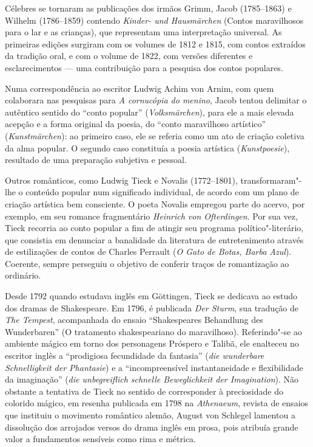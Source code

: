 Célebres se tornaram as publicações dos irmãos Grimm, Jacob (1785--1863)
e Wilhelm (1786--1859) contendo \textit{Kinder- und Hausmärchen}
(Contos maravilhosos para o lar e as crianças), que
representam uma interpretação universal. As primeiras edições surgiram
com os volumes de 1812 e 1815, com contos extraídos da tradição oral, e
com o volume de 1822, com versões diferentes e esclarecimentos — uma
contribuição para a pesquisa dos contos populares.

Numa correspondência ao escritor Ludwig Achim von Arnim, com quem
colaborara nas pesquisas para \textit{A cornucópia do menino}, Jacob tentou
delimitar o autêntico sentido do ``conto popular'' (\textit{Volksmärchen}), para
ele a mais elevada acepção e a forma original da poesia, do ``conto maravilhoso
artístico'' (\textit{Kunstmärchen}): ao primeiro caso, ele se referia como um ato
de criação coletiva da alma popular. O segundo caso constituía a poesia
artística (\textit{Kunstpoesie}), resultado de uma preparação subjetiva e pessoal. 

Outros românticos, como Ludwig Tieck e Novalis (1772--1801),
transformaram"-lhe o conteúdo popular num significado individual, de
acordo com um plano de criação artística bem consciente. O poeta
Novalis empregou parte do acervo, por exemplo, em seu romance
fragmentário \textit{Heinrich von Ofterdingen}. Por sua vez, Tieck
recorria ao conto popular a fim de atingir seu programa
político"-literário, que consistia em denunciar a banalidade da
literatura de entretenimento através de estilizações de contos de
Charles Perrault (\textit{O Gato de Botas, Barba Azul}). Coerente, sempre
perseguiu o objetivo de conferir traços de romantização ao \mbox{ordinário}.  

Desde 1792 quando estudava inglês em Göttingen, Tieck se dedicava ao
estudo dos dramas de Shakespeare. Em 1796, é publicada \textit{Der Sturm}, 
sua tradução de \textit{The Tempest}, acompanhada do ensaio
``Shakespeares Behandlung des Wunderbaren'' (O tratamento shakespeariano
do maravilhoso). Referindo"-se ao ambiente mágico em torno dos
personagens Próspero e Talibã, ele enalteceu no escritor inglês a
``prodigiosa fecundidade da fantasia'' (\textit{die wunderbare Schnelligkeit der
Phantasie}) e a ``incompreensível instantaneidade e flexibilidade da
imaginação'' (\textit{die unbegreiflich schnelle Beweglichkeit der Imagination}).
Não obstante a tentativa de Tieck no sentido de corresponder à
preciosidade do colorido mágico, em resenha publicada em 1798 na
\textit{Athenaeum}, revista de ensaios que instituiu o movimento
romântico alemão, August von Schlegel lamentou a dissolução dos
arrojados versos do drama \mbox{inglês} em prosa, pois atribuía grande 
valor a fundamentos sensíveis como rima e métrica.

